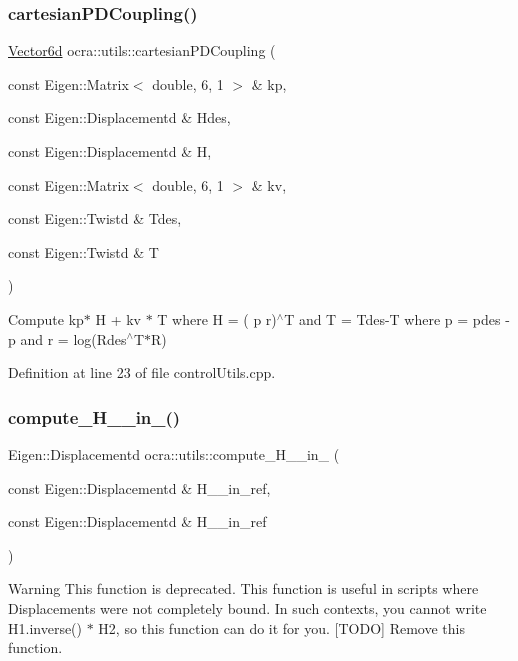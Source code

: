 \subsubsection{\texorpdfstring{cartesian\+P\+D\+Coupling()}{cartesianPDCoupling()}}
{\footnotesize\ttfamily \hyperlink{namespaceocra_a72fe7d6cf8411efbfc475a3a78209867}{Vector6d} ocra\+::utils\+::cartesian\+P\+D\+Coupling (\begin{DoxyParamCaption}\item[{const Eigen\+::\+Matrix$<$ double, 6, 1 $>$ \&}]{kp,  }\item[{const Eigen\+::\+Displacementd \&}]{Hdes,  }\item[{const Eigen\+::\+Displacementd \&}]{H,  }\item[{const Eigen\+::\+Matrix$<$ double, 6, 1 $>$ \&}]{kv,  }\item[{const Eigen\+::\+Twistd \&}]{Tdes,  }\item[{const Eigen\+::\+Twistd \&}]{T }\end{DoxyParamCaption})}

Compute kp$\ast$ H + kv $\ast$  T where  H = ( p  r)$^\wedge$T and  T = Tdes-\/T where  p = pdes -\/ p and  r = log(\+Rdes$^\wedge$\+T$\ast$\+R) 

Definition at line 23 of file control\+Utils.\+cpp.

\hypertarget{namespaceocra_1_1utils_a9158ce8ea082d7620fd3204979c75c09}{}\label{namespaceocra_1_1utils_a9158ce8ea082d7620fd3204979c75c09} 
\subsubsection{\texorpdfstring{compute\+\_\+\+H\+\_\+\_\+in\+\_()}{compute\_H\_2\_in\_1()}}
{\footnotesize\ttfamily Eigen\+::\+Displacementd ocra\+::utils\+::compute\+\_\+\+H\+\_\+\_\+in\+\_ (\begin{DoxyParamCaption}\item[{const Eigen\+::\+Displacementd \&}]{H\+\_\+\_\+in\+\_\+ref,  }\item[{const Eigen\+::\+Displacementd \&}]{H\+\_\+\_\+in\+\_\+ref }\end{DoxyParamCaption})}

\begin{DoxyWarning}{Warning}
This function is deprecated. This function is useful in scripts where Displacements were not completely bound. In such contexts, you cannot write H1.\+inverse() $\ast$ H2, so this function can do it for you. \mbox{[}T\+O\+DO\mbox{]} Remove this function. 
\end{DoxyWarning}


